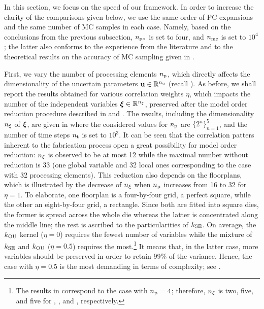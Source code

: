 In this section, we focus on the speed of our framework.
In order to increase the clarity of the comparisons given below, we use the same order of PC expansions and the same number of MC samples in each case.
Namely, based on the conclusions from the previous subsection, ${n_\text{po}}$ is set to four, and ${n_\text{mc}}$ is set to $10^4$; the latter also conforms to the experience from the literature \cite{huang2009, lee2013, shen2009, bhardwaj2008, ghanta2006} and to the theoretical results on the accuracy of MC sampling given in \cite{diaz-emparanza2002}.

First, we vary the number of processing elements ${n_\text{p}}$, which directly affects the dimensionality of the uncertain parameters $\mathbf{u} \in \mathbb{R}^{n_\text{u}}$ (recall ).
As before, we shall report the results obtained for various correlation weights $\eta$, which impacts the number of the independent variables $\boldsymbol{\xi} \in \mathbb{R}^{n_\xi}$, preserved after the model order reduction procedure described in  and .
The results, including the dimensionality ${n_\xi}$ of $\boldsymbol{\xi}$, are given in  where the considered values for ${n_\text{p}}$ are $\{ 2^n \}_{n = 1}^5$, and the number of time steps ${n_\text{t}}$ is set to $10^3$.
It can be seen that the correlation patters inherent to the fabrication process \cite{cheng2011} open a great possibility for model order reduction: ${n_\xi}$ is observed to be at most 12 while the maximal number without reduction is 33 (one global variable and 32 local ones corresponding to the case with 32 processing elements).
This reduction also depends on the floorplans, which is illustrated by the decrease of ${n_\xi}$ when ${n_\text{p}}$ increases from 16 to 32 for $\eta = 1$.
To elaborate, one floorplan is a four-by-four grid, a perfect square, while the other an eight-by-four grid, a rectangle.
Since both are fitted into square dies, the former is spread across the whole die whereas the latter is concentrated along the middle line; the rest is ascribed to the particularities of $k_{\text{SE}}$.
On average, the $k_{\text{OU}}$ kernel ($\eta = 0$) requires the fewest number of variables while the mixture of $k_{\text{SE}}$ and $k_{\text{OU}}$ ($\eta = 0.5$) requires the most.\footnote{The results in  correspond to the case with ${n_\text{p}} = 4$; therefore, ${n_\xi}$ is two, five, and five for , , and , respectively.}
It means that, in the latter case, more variables should be preserved in order to retain 99\% of the variance.
Hence, the case with $\eta = 0.5$ is the most demanding in terms of complexity; see .

